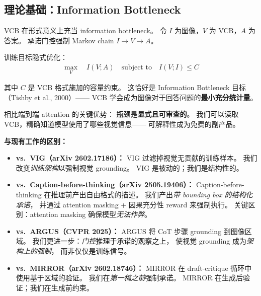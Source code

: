 \documentclass[12pt,a4paper]{article}
\begin{document}
\subsection{理论基础：Information Bottleneck}

VCB 在形式意义上充当 information bottleneck。
令 $I$ 为图像，$V$ 为 VCB，$A$ 为答案。
承诺门控强制 Markov chain $I \rightarrow V \rightarrow A$。

训练目标隐式优化：
\begin{align}
\max_{V} \quad I(V; A) \quad \text{subject to} \quad I(V; I) \leq C
\end{align}

其中 $C$ 是 VCB 格式施加的容量约束。
这恰好是 Information Bottleneck 目标（Tishby et al., 2000）——
VCB 学会成为图像对于回答问题的\textbf{最小充分统计量}。

相比端到端 attention 的关键优势：
瓶颈是\textbf{显式且可审查的}。
我们可以读取 VCB，精确知道模型使用了哪些视觉信息——
可解释性成为免费的副产品。

\begin{relatedbox}
\textbf{与现有工作的区别：}
\begin{itemize}[leftmargin=1.5em]
  \item \textbf{vs.\ VIG（arXiv 2602.17186）：}
    VIG 过滤掉视觉无贡献的训练样本。
    我们改变\textit{训练架构}以强制视觉 grounding。
    VIG 是被动的；我们是结构性的。
  \item \textbf{vs.\ Caption-before-thinking（arXiv 2505.19406）：}
    Caption-before-thinking 在推理前产出自由格式的描述。
    我们产出\textit{带 bounding box 的结构化承诺}，
    并通过 attention masking + 因果充分性 reward 来强制执行。
    关键区别：attention masking 确保模型\textit{无法作弊}。
  \item \textbf{vs.\ ARGUS（CVPR 2025）：}
    ARGUS 将 CoT 步骤 grounding 到图像区域。
    我们更进一步：\textit{门控}推理于承诺的观察之上，
    使视觉 grounding 成为\textit{架构上的强制}，
    而非仅仅是训练信号。
  \item \textbf{vs.\ MIRROR（arXiv 2602.18746）：}
    MIRROR 在 draft-critique 循环中使用基于区域的验证。
    我们在\textit{第一稿之前}强制承诺。
    MIRROR 在生成后验证；我们在生成前约束。
\end{itemize}
\end{relatedbox}
\end{document}
